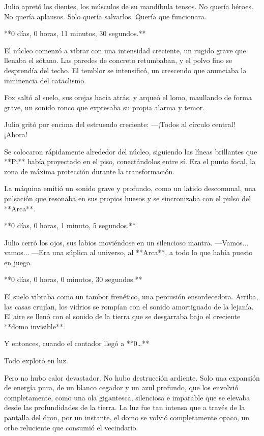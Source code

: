 \documentclass[a4paper,12pt]{book}
\begin{document}
Julio apretó los dientes, los músculos de su mandíbula tensos. No quería héroes. No quería aplausos. Solo quería salvarlos. Quería que funcionara.

**0 días, 0 horas, 11 minutos, 30 segundos.**

El núcleo comenzó a vibrar con una intensidad creciente, un rugido grave que llenaba el sótano. Las paredes de concreto retumbaban, y el polvo fino se desprendía del techo. El temblor se intensificó, un crescendo que anunciaba la inminencia del cataclismo.

Fox saltó al suelo, sus orejas hacia atrás, y arqueó el lomo, maullando de forma grave, un sonido ronco que expresaba su propia alarma y temor.

Julio gritó por encima del estruendo creciente: —¡Todos al círculo central! ¡Ahora!

Se colocaron rápidamente alrededor del núcleo, siguiendo las líneas brillantes que **Pi** había proyectado en el piso, conectándolos entre sí. Era el punto focal, la zona de máxima protección durante la transformación.

La máquina emitió un sonido grave y profundo, como un latido descomunal, una pulsación que resonaba en sus propios huesos y se sincronizaba con el pulso del **Arca**.

**0 días, 0 horas, 1 minuto, 5 segundos.**

Julio cerró los ojos, sus labios moviéndose en un silencioso mantra. —Vamos... vamos... —Era una súplica al universo, al **Arca**, a todo lo que había puesto en juego.

**0 días, 0 horas, 0 minutos, 30 segundos.**

El suelo vibraba como un tambor frenético, una percusión ensordecedora. Arriba, las casas crujían, los vidrios se rompían con el sonido amortiguado de la lejanía. El aire se llenó con el sonido de la tierra que se desgarraba bajo el creciente **domo invisible**.

Y entonces, cuando el contador llegó a **0…**

Todo explotó en luz.

Pero no hubo calor devastador. No hubo destrucción ardiente. Solo una expansión de energía pura, de un blanco cegador y un azul profundo, que los envolvió completamente, como una ola gigantesca, silenciosa e imparable que se elevaba desde las profundidades de la tierra. La luz fue tan intensa que a través de la pantalla del dron, por un instante, el domo se volvió completamente opaco, un orbe reluciente que consumió el vecindario.
\end{document}
